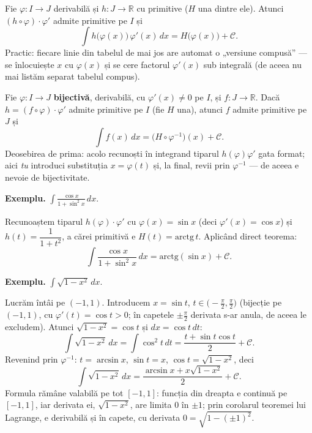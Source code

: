 \begin{teorema}
Fie $\varphi:I\to J$ derivabilă și $h:J\to\mathbb{R}$ cu primitive ($H$ una dintre ele). Atunci $(h\circ\varphi)\cdot\varphi'$ admite primitive pe $I$ și
\[
\int h\big(\varphi(x)\big)\,\varphi'(x)\,dx=H\big(\varphi(x)\big)+\mathcal C.
\]
Practic: fiecare linie din tabelul de mai jos are automat o „versiune compusă'' --- se înlocuiește $x$ cu $\varphi(x)$ și se cere factorul $\varphi'(x)$ sub integrală (de aceea nu mai listăm separat tabelul compus).
\end{teorema}

\begin{teorema}
Fie $\varphi:I\to J$ \textbf{bijectivă}, derivabilă, cu $\varphi'(x)\neq0$ pe $I$, și $f:J\to\mathbb{R}$. Dacă $h=(f\circ\varphi)\cdot\varphi'$ admite primitive pe $I$ (fie $H$ una), atunci $f$ admite primitive pe $J$ și
\[
\int f(x)\,dx=\big(H\circ\varphi^{-1}\big)(x)+\mathcal C.
\]
Deosebirea de prima: acolo recunoști în integrand tiparul $h(\varphi)\varphi'$ gata format; aici \emph{tu} introduci substituția $x=\varphi(t)$ și, la final, revii prin $\varphi^{-1}$ --- de aceea e nevoie de bijectivitate.
\end{teorema}


\medskip
\textbf{Exemplu.} $\displaystyle\int \frac{\cos x}{1+\sin^2 x}\,dx$.

Recunoaștem tiparul $h(\varphi)\cdot\varphi'$ cu $\varphi(x)=\sin x$ (deci $\varphi'(x)=\cos x$) și $h(t)=\dfrac{1}{1+t^2}$, a cărei primitivă e $H(t)=\mathrm{arctg}\,t$. Aplicând direct teorema:
\[
\int \frac{\cos x}{1+\sin^2 x}\,dx = \mathrm{arctg}(\sin x)+\mathcal C.
\]

\medskip
\textbf{Exemplu.} $\displaystyle\int \sqrt{1-x^2}\,dx$.

Lucrăm întâi pe $(-1,1)$. Introducem $x=\sin t$, $t\in\bigl(-\frac\pi2,\frac\pi2\bigr)$ (bijecție pe $(-1,1)$, cu $\varphi'(t)=\cos t>0$; în capetele $\pm\frac\pi2$ derivata s-ar anula, de aceea le excludem). Atunci $\sqrt{1-x^2}=\cos t$ și $dx=\cos t\,dt$:
\[
\int \sqrt{1-x^2}\,dx = \int \cos^2 t\,dt = \frac{t+\sin t\cos t}{2}+\mathcal C.
\]
Revenind prin $\varphi^{-1}$: $t=\arcsin x$, $\sin t=x$, $\cos t=\sqrt{1-x^2}$, deci
\[
\int \sqrt{1-x^2}\,dx = \frac{\arcsin x + x\sqrt{1-x^2}}{2}+\mathcal C.
\]
Formula rămâne valabilă pe tot $[-1,1]$: funcția din dreapta e continuă pe $[-1,1]$, iar derivata ei, $\sqrt{1-x^2}$, are limita $0$ în $\pm1$; prin corolarul teoremei lui Lagrange, e derivabilă și în capete, cu derivata $0=\sqrt{1-(\pm1)^2}$.


